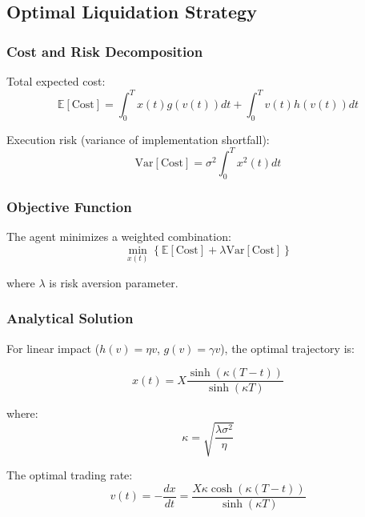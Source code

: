 \documentclass[11pt,a4paper]{article}
\newcommand{\E}{\mathbb{E}}
\newcommand{\Var}{\text{Var}}
\begin{document}
\subsection{Optimal Liquidation Strategy}

\subsubsection{Cost and Risk Decomposition}

Total expected cost:
\begin{equation}
\E[\text{Cost}] = \int_0^T x(t) g(v(t)) dt + \int_0^T v(t) h(v(t)) dt
\end{equation}

Execution risk (variance of implementation shortfall):
\begin{equation}
\Var[\text{Cost}] = \sigma^2 \int_0^T x^2(t) dt
\end{equation}

\subsubsection{Objective Function}

The agent minimizes a weighted combination:
\begin{equation}
\min_{x(t)} \left\{\E[\text{Cost}] + \lambda \Var[\text{Cost}]\right\}
\end{equation}

where $\lambda$ is risk aversion parameter.

\subsubsection{Analytical Solution}

For linear impact ($h(v) = \eta v$, $g(v) = \gamma v$), the optimal trajectory is:

\begin{equation}
x(t) = X \frac{\sinh\left(\kappa(T - t)\right)}{\sinh(\kappa T)}
\end{equation}

where:
\begin{equation}
\kappa = \sqrt{\frac{\lambda \sigma^2}{\eta}}
\end{equation}

The optimal trading rate:
\begin{equation}
v(t) = -\frac{dx}{dt} = \frac{X \kappa \cosh\left(\kappa(T-t)\right)}{\sinh(\kappa T)}
\end{equation}
\end{document}
